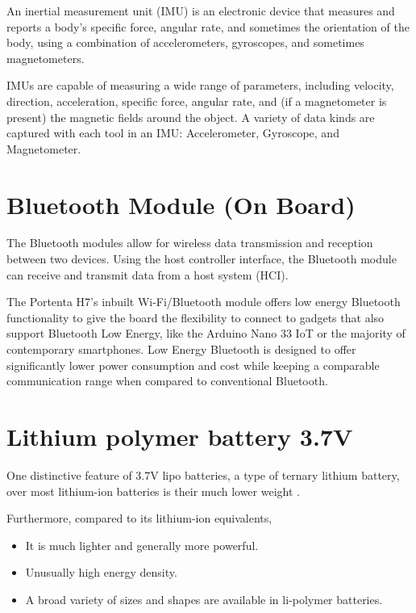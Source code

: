 An inertial measurement unit (IMU) is an electronic device that measures and reports a body's specific force, angular rate, and sometimes the orientation of the body, using a combination of accelerometers, gyroscopes, and sometimes magnetometers. 

\bigskip

IMUs are capable of measuring a wide range of parameters, including velocity, direction, acceleration, specific force, angular rate, and (if a magnetometer is present) the magnetic fields around the object. A variety of data kinds are captured with each tool in an IMU: Accelerometer, Gyroscope, and Magnetometer.

\section{Bluetooth Module (On Board)}

The Bluetooth modules allow for wireless data transmission and reception between two devices. Using the host controller interface, the Bluetooth module can receive and transmit data from a host system (HCI).

\bigskip

The Portenta H7's inbuilt Wi-Fi/Bluetooth module offers low energy Bluetooth functionality to give the board the flexibility to connect to gadgets that also support Bluetooth Low Energy, like the Arduino Nano 33 IoT or the majority of contemporary smartphones. Low Energy Bluetooth is designed to offer significantly lower power consumption and cost while keeping a comparable communication range when compared to conventional Bluetooth.

\section{Lithium polymer battery 3.7V}

One distinctive feature of 3.7V lipo batteries, a type of ternary lithium battery, over most lithium-ion batteries is their much lower weight \cite{wiki:Lithium_polymer_battery}.

\bigskip

Furthermore, compared to its lithium-ion equivalents,

\begin{itemize}
\item It is much lighter and generally more powerful.

\item Unusually high energy density.

\item A broad variety of sizes and shapes are available in li-polymer batteries.

\end{itemize}